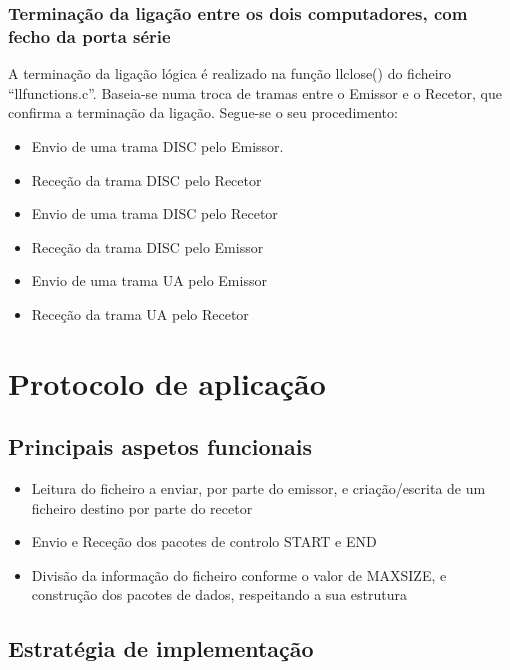 \documentclass[article, a4paper, 11pt, oneside]{memoir}
\begin{document}
 \subsection{Terminação da ligação entre os dois computadores, com fecho da porta série}
A terminação da ligação lógica é realizado na função llclose() do ficheiro “llfunctions.c”. 
Baseia-se numa troca de tramas entre o Emissor e o Recetor, que confirma a terminação da ligação. 
Segue-se o seu procedimento:
\begin{itemize}
	\item Envio de uma trama DISC pelo Emissor.
	\item Receção da trama DISC pelo Recetor
	\item Envio de uma trama DISC pelo Recetor
	\item Receção da trama DISC pelo Emissor
	\item Envio de uma trama UA pelo Emissor
	\item Receção da trama UA pelo Recetor
\end{itemize}


\newpage
\chapter[Protocolo de aplicação][Protocolo de aplicação]{Protocolo de aplicação} \label{\thechapter}
  
\section{Principais aspetos funcionais}
\begin{itemize}
  \item Leitura do ficheiro a enviar, por parte do emissor, e criação/escrita de um ficheiro destino por parte do recetor
  \item Envio e Receção dos pacotes de controlo START e END
  \item Divisão da informação do ficheiro conforme o valor de MAX\textunderscore SIZE, e construção dos pacotes de dados, respeitando a sua estrutura
\end{itemize}

\section{Estratégia de implementação}
\end{document}
